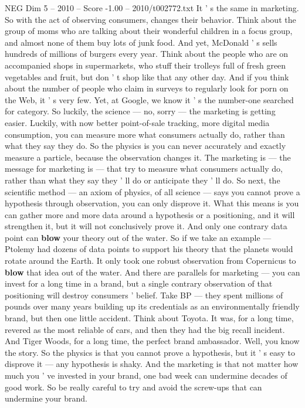 \begin{textsample}{NEG Dim 5 – 2010 – Score -1.00 – 2010/t002772.txt}
It ' s the same in marketing.
So with the act of observing consumers, changes their behavior.
Think about the group of moms who are talking about their wonderful children in a focus group, and almost none of them buy lots of junk food.
And yet, McDonald ' s sells hundreds of millions of burgers every year.
Think about the people who are on accompanied shops in supermarkets, who stuff their trolleys full of fresh green vegetables and fruit, but don ' t shop like that any other day.
And if you think about the number of people who claim in surveys to regularly look for porn on the Web, it ' s very few.
Yet, at Google, we know it ' s the number-one searched for category.
So luckily, the science — no, sorry — the marketing is getting easier.
Luckily, with now better point-of-sale tracking, more digital media consumption, you can measure more what consumers actually do, rather than what they say they do.
So the physics is you can never accurately and exactly measure a particle, because the observation changes it.
The marketing is — the message for marketing is — that try to measure what consumers actually do, rather than what they say they ' ll do or anticipate they ' ll do.
So next, the scientific method — an axiom of physics, of all science — says you cannot prove a hypothesis through observation, you can only disprove it.
What this means is you can gather more and more data around a hypothesis or a positioning, and it will strengthen it, but it will not conclusively prove it.
And only one contrary data point can \textbf{blow} your theory out of the water.
So if we take an example — Ptolemy had dozens of data points to support his theory that the planets would rotate around the Earth.
It only took one robust observation from Copernicus to \textbf{blow} that idea out of the water.
And there are parallels for marketing — you can invest for a long time in a brand, but a single contrary observation of that positioning will destroy consumers ' belief.
Take BP — they spent millions of pounds over many years building up its credentials as an environmentally friendly brand, but then one little accident.
Think about Toyota.
It was, for a long time, revered as the most reliable of cars, and then they had the big recall incident.
And Tiger Woods, for a long time, the perfect brand ambassador.
Well, you know the story.
So the physics is that you cannot prove a hypothesis, but it ' s easy to disprove it — any hypothesis is shaky.
And the marketing is that not matter how much you ' ve invested in your brand, one bad week can undermine decades of good work.
So be really careful to try and avoid the screw-ups that can undermine your brand.

\end{textsample}

